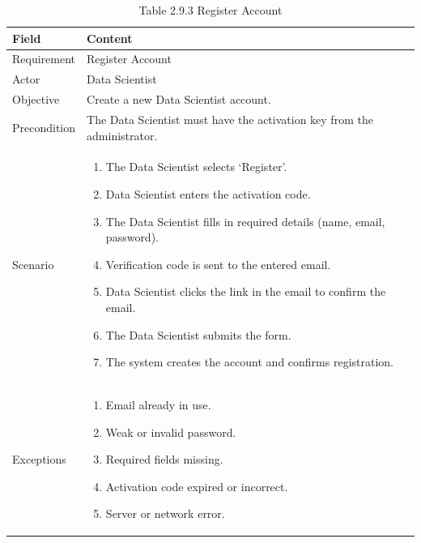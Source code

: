 \documentclass[12pt,oneside]{report}
\begin{document}
\begin{table}[H]
\centering
\caption{Table 2.9.3 Register Account}
\label{tab:ds-register}
\begin{tabularx}{\textwidth}{|p{3cm}|X|}
\hline
\textbf{Field} & \textbf{Content} \\ \hline

Requirement & Register Account \\ \hline

Actor & Data Scientist \\ \hline

Objective & Create a new Data Scientist account. \\ \hline

Precondition & The Data Scientist must have the activation key from the administrator. \\ \hline

Scenario & 
\begin{minipage}[t]{0.75\textwidth}
\begin{enumerate}[leftmargin=*,label=\arabic*.]
\item The Data Scientist selects ‘Register’.
\item Data Scientist enters the activation code.
\item The Data Scientist fills in required details (name, email, password).
\item Verification code is sent to the entered email.
\item Data Scientist clicks the link in the email to confirm the email.
\item The Data Scientist submits the form.
\item The system creates the account and confirms registration.
\end{enumerate}
\end{minipage} \\ \hline

Exceptions &
\begin{minipage}[t]{0.75\textwidth}
\begin{enumerate}[leftmargin=*,label=\arabic*.]
\item Email already in use.
\item Weak or invalid password.
\item Required fields missing.
\item Activation code expired or incorrect.
\item Server or network error.
\end{enumerate}
\end{minipage} \\ \hline

\end{tabularx}
\end{table}
\end{document}
